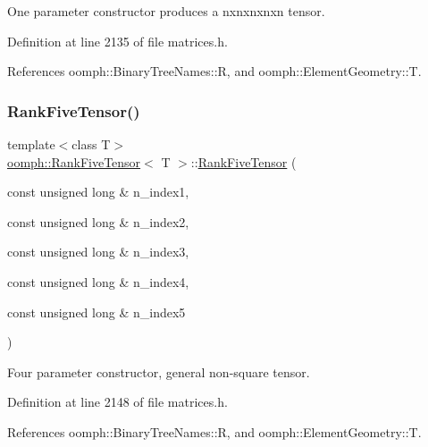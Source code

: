 One parameter constructor produces a nxnxnxnxn tensor. 



Definition at line 2135 of file matrices.\+h.



References oomph\+::\+Binary\+Tree\+Names\+::R, and oomph\+::\+Element\+Geometry\+::T.

\mbox{\label{classoomph_1_1RankFiveTensor_af7e765aecc61bca8ad9742e07822c54f}} 
\subsubsection{\texorpdfstring{Rank\+Five\+Tensor()}{RankFiveTensor()}\hspace{0.1cm}{\footnotesize\ttfamily [4/5]}}
{\footnotesize\ttfamily template$<$class T$>$ \\
\hyperlink{classoomph_1_1RankFiveTensor}{oomph\+::\+Rank\+Five\+Tensor}$<$ T $>$\+::\hyperlink{classoomph_1_1RankFiveTensor}{Rank\+Five\+Tensor} (\begin{DoxyParamCaption}\item[{const unsigned long \&}]{n\+\_\+index1,  }\item[{const unsigned long \&}]{n\+\_\+index2,  }\item[{const unsigned long \&}]{n\+\_\+index3,  }\item[{const unsigned long \&}]{n\+\_\+index4,  }\item[{const unsigned long \&}]{n\+\_\+index5 }\end{DoxyParamCaption})\hspace{0.3cm}{\ttfamily [inline]}}



Four parameter constructor, general non-\/square tensor. 



Definition at line 2148 of file matrices.\+h.



References oomph\+::\+Binary\+Tree\+Names\+::R, and oomph\+::\+Element\+Geometry\+::T.

\mbox{\label{classoomph_1_1RankFiveTensor_a79ebab81e4e9f7fdd193f59a4858930c}} 
